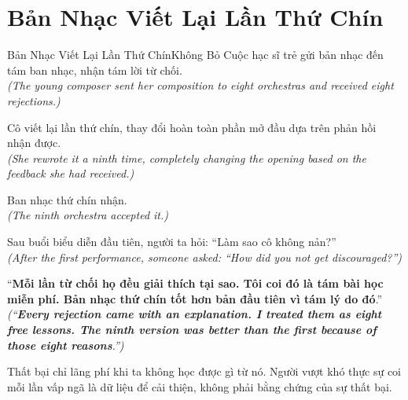 \section{Bản Nhạc Viết Lại Lần Thứ Chín}
\begin{truyen}{Bản Nhạc Viết Lại Lần Thứ Chín}{Không Bỏ Cuộc}
hạc sĩ trẻ gửi bản nhạc đến tám ban nhạc, nhận tám lời từ chối.\\
\textit{(The young composer sent her composition to eight orchestras and received eight rejections.)}

Cô viết lại lần thứ chín, thay đổi hoàn toàn phần mở đầu dựa trên phản hồi nhận được.\\
\textit{(She rewrote it a ninth time, completely changing the opening based on the feedback she had received.)}

Ban nhạc thứ chín nhận.\\
\textit{(The ninth orchestra accepted it.)}

Sau buổi biểu diễn đầu tiên, người ta hỏi: ``Làm sao cô không nản?''\\
\textit{(After the first performance, someone asked: ``How did you not get discouraged?'')}

``\textbf{Mỗi lần từ chối họ đều giải thích tại sao. Tôi coi đó là tám bài học miễn phí. Bản nhạc thứ chín tốt hơn bản đầu tiên vì tám lý do đó}.''\\
\textit{(``\textbf{Every rejection came with an explanation. I treated them as eight free lessons. The ninth version was better than the first because of those eight reasons}.'')}
\end{truyen}
\begin{baihoc}
  Thất bại chỉ lãng phí khi ta không học được gì từ nó. Người vượt khó thực sự coi mỗi lần vấp ngã là dữ liệu để cải thiện, không phải bằng chứng của sự thất bại.
\end{baihoc}

